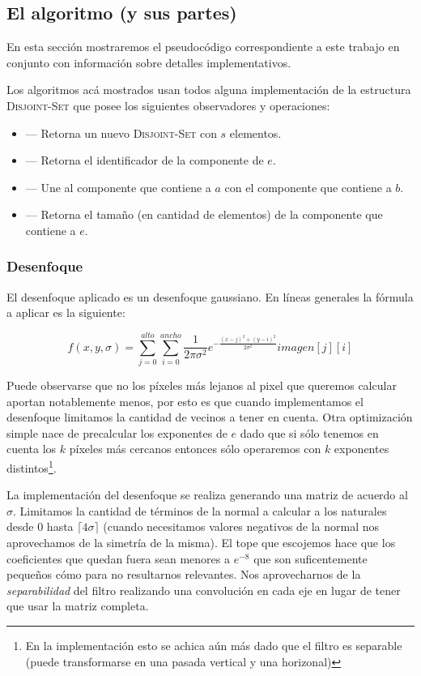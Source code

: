 \subsection{El algoritmo (y sus partes)}

En esta sección mostraremos el pseudocódigo correspondiente a este trabajo en
conjunto con información sobre detalles implementativos.

Los algoritmos acá mostrados usan todos alguna implementación de la estructura
\textsc{Disjoint-Set} que posee los siguientes observadores y operaciones:

\begin{itemize}
	\item {}
		--- Retorna un nuevo \textsc{Disjoint-Set} con $s$ elementos.
	\item {}
		--- Retorna el identificador de la componente de $e$.
	\item {}
		--- Une al componente que contiene a $a$ con el componente que
		contiene a $b$.
	\item {}
		--- Retorna el tamaño (en cantidad de elementos) de la
		componente que contiene a $e$.
\end{itemize}

\subsubsection{Desenfoque}

El desenfoque aplicado es un desenfoque gaussiano. En líneas generales la
fórmula a aplicar es la siguiente:

\[
	f(x,y,\sigma) =
		\sum_{j=0}^{alto} \! \sum_{i=0}^{ancho} \!
			\frac{1}{2\pi\sigma^2}
			e^{-\frac{{(x - j)}^2 + {(y - i)}^2}{2\sigma^2}}
			\textit{imagen}[j][i]
\]

Puede observarse que no los píxeles más lejanos al pixel que queremos calcular
aportan notablemente menos, por esto es que cuando implementamos el desenfoque
limitamos la cantidad de vecinos a tener en cuenta. Otra optimización simple
nace de precalcular los exponentes de $e$ dado que si sólo tenemos en cuenta
los $k$ píxeles más cercanos entonces sólo operaremos con $k$ exponentes
distintos\footnote{En la implementación esto se achica aún más dado que el
filtro es separable (puede transformarse en una pasada vertical y una
horizonal)}.

La implementación del desenfoque se realiza generando una matriz de acuerdo al
$\sigma$. Limitamos la cantidad de términos de la normal a calcular a los
naturales desde $0$ hasta $\lceil 4 \sigma \rceil$ (cuando necesitamos valores
negativos de la normal nos aprovechamos de la simetría de la misma). El tope
que escojemos hace que los coeficientes que quedan fuera sean menores a
$e^{-8}$ que son suficentemente pequeños cómo para no resultarnos relevantes.
Nos aprovecharnos de la \emph{separabilidad} del filtro realizando una
convolución en cada eje en lugar de tener que usar la matriz completa.


